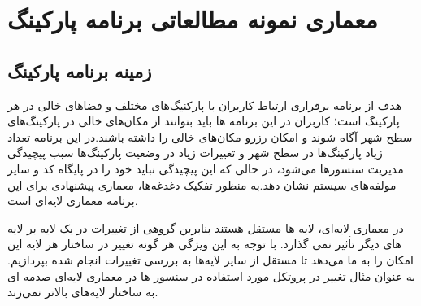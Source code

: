 \chapter{معماری نمونه مطالعاتی برنامه پارکینگ}

\section{زمینه برنامه‌ پارکینگ}
هدف از برنامه برقراری ارتباط کاربران با پارکنیگ‌‌های مختلف و فضا‌های خالی در هر پارکینگ است؛ کاربران در این برنامه ها باید بتوانند از مکان‌های خالی در پارکینگ‌های سطح شهر آگاه شوند و امکان رزرو مکان‌های خالی را داشته باشند.در این برنامه تعداد زیاد پارکینگ‌ها در سطح شهر و تغییرات زیاد در وضعیت پارکینگ‌ها سبب پیچیدگی مدیریت سنسور‌ها می‌شود، در حالی که این پیچیدگی نباید خود را در پایگاه کد و سایر مولفه‌های سیستم نشان دهد.به منظور تفکیک دغدغه‌ها، معماری پیشنهادی برای این برنامه معماری لایه‌ای است.

در معماری لایه‌ای، لایه ها مستقل هستند بنابرین گروهی از تغییرات در یک لایه بر لایه های دیگر تأثیر نمی گذارد. با توجه به این ویژگی هر گونه تغییر در ساختار هر لایه این امکان را به ما می‌دهد تا مستقل از سایر لایه‌‌ها به بررسی تغییرات انجام شده بپردازیم. به عنوان مثال تغییر در پروتکل مورد استفاده در سنسور ها در معماری لایه‌ای صدمه ای به ساختار لایه‌های بالاتر نمی‌زند.
